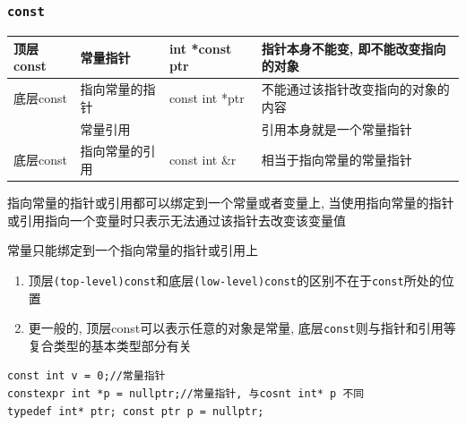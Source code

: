\subsection{}
\subsubsection{\tt const}
\begin{center}
	\begin{tabular}[b]{|l|l|l|l|}
		\hline
		顶层const&常量指针&int *const ptr&指针本身不能变, 即不能改变指向的对象\\
		\hline
		底层const&指向常量的指针&const int *ptr&不能通过该指针改变指向的对象的内容\\
		\hline
		&常量引用&&引用本身就是一个常量指针\\
		\hline
		底层const&指向常量的引用&const int \&r&相当于指向常量的常量指针\\
		\hline
	\end{tabular}
\end{center}

指向常量的指针或引用都可以绑定到一个常量或者变量上, 当使用指向常量的指针或引用指向一个变量时只表示无法通过该指针去改变该变量值

常量只能绑定到一个指向常量的指针或引用上

\begin{enumerate}
	\item 顶层{\tt(top-level)const}和底层{\tt(low-level)const}的区别不在于{\tt const}所处的位置
	\item 更一般的, 顶层const可以表示任意的对象是常量, 底层{\tt const}则与指针和引用等复合类型的基本类型部分有关
\end{enumerate}

\begin{lstlisting}[title=三种{\tt const}在开头的顶层{\tt const}]
const int v = 0;//常量指针
constexpr int *p = nullptr;//常量指针, 与cosnt int* p 不同
typedef int* ptr; const ptr p = nullptr;
\end{lstlisting}

